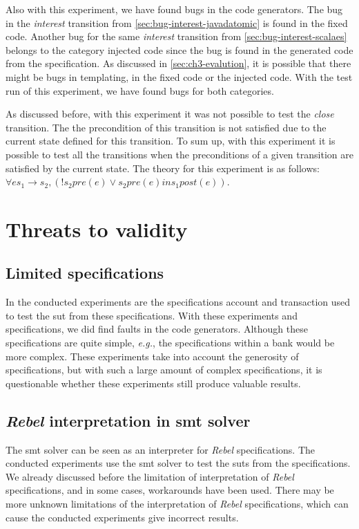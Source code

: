 Also with this experiment, we have found bugs in the code generators. The bug
in the \textit{interest} transition from \autoref{sec:bug-interest-javadatomic} is found
in the fixed code. Another bug for the same \textit{interest} transition from
\autoref{sec:bug-interest-scalaes} belongs to the category injected code since
the bug is found in the generated code from the specification. As discussed in
\autoref{sec:ch3-evalution}, it is possible that there might be bugs in
templating, in the fixed code or the injected code. With the test run of this
experiment, we have found bugs for both categories.

As discussed before, with this experiment it was not possible to test the
\textit{close} transition. The the precondition of this transition is not
satisfied due to the current state defined for this transition. To sum up, with
this experiment it is possible to test all the transitions when the
preconditions of a given transition are satisfied by the current state. The
theory for this experiment is as follows:
$\forall e s_{1} \to s_{2}, (! s_{2} pre(e) \lor s_{2} pre(e) in s_{1} post(e))$.


\section{Threats to validity}

\subsection*{Limited specifications}
In the conducted experiments are the specifications account and transaction used
to test the \gls{sut} from these specifications. With these experiments
and specifications, we did find faults in the code generators. Although
these specifications are quite simple, \textit{e.g.}, the specifications within
a bank would be more complex. These experiments take into account the
generosity of specifications, but with such a large amount of complex
specifications, it is questionable whether these experiments still produce
valuable results.

\subsection*{\textit{Rebel} interpretation in \gls{smt} solver}
The \gls{smt} solver can be seen as an interpreter for \textit{Rebel} specifications. The
conducted experiments use the \gls{smt} solver to test the \gls{sut}s from the
specifications. We already discussed before the limitation of interpretation of
\textit{Rebel} specifications, and in some cases, workarounds have been used. There may
be more unknown limitations of the interpretation of \textit{Rebel} specifications, which
can cause the conducted experiments give incorrect results.

